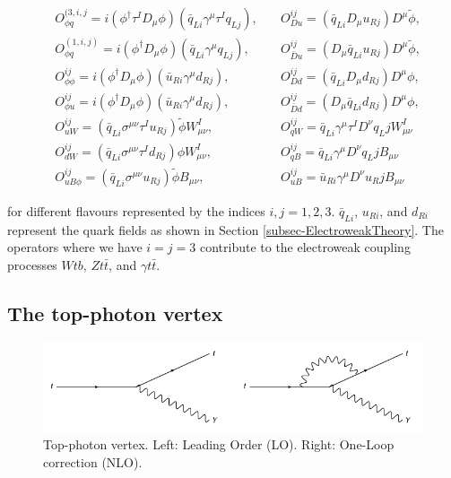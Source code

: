\begin{align}
& O^{(3, i, j}_{\phi q} = i(\phi^{\dagger}\tau^I D_{\mu} \phi)(\bar{q}_{Li}\gamma^{\mu}\tau^I q_{Lj}), \quad & O^{ij}_{Du} = (\bar{q}_{Li} D_{\mu} u_{Rj}) D^{\mu} \tilde{\phi}, \\
& O^{(1, i, j)}_{\phi q} = i(\phi^{\dagger} D_{\mu} \phi)(\bar{q}_{Li}\gamma^{\mu} q_{Lj}), \quad & O^{ij}_{\bar{D}u} = (D_{\mu} \bar{q}_{Li} u_{Rj}) D^{\mu} \tilde{\phi}, \\
& O^{ij}_{\phi \phi} = i(\phi^{\dagger} D_{\mu} \phi)(\bar{u}_{Ri}\gamma^{\mu} d_{Rj}), \quad & O^{ij}_{Dd} = (\bar{q}_{Li} D_{\mu} d_{Rj}) D^{\mu} \phi, \\
& O^{ij}_{\phi u} = i(\phi^{\dagger} D_{\mu} \phi)(\bar{u}_{Ri}\gamma^{\mu} d_{Rj}), \quad & O^{ij}_{\bar{D}d} = (D_{\mu} \bar{q}_{Li} d_{Rj}) D^{\mu} \phi, \\
& O^{ij}_{uW} = (\bar{q}_{Li} \sigma^{\mu \nu} \tau^I u_{Rj})\tilde{\phi} W^I_{\mu \nu}, \quad & O^{ij}_{qW} = \bar{q}_{Li} \gamma^{\mu} \tau^I D^{\nu} q_Lj W^I_{\mu \nu}\\
& O^{ij}_{dW} = (\bar{q}_{Li} \sigma^{\mu \nu} \tau^I d_{Rj})\phi W^I_{\mu \nu}, \quad & O^{ij}_{qB} = \bar{q}_{Li} \gamma^{\mu} D^{\nu} q_Lj B_{\mu \nu}\\
& O^{ij}_{uB\phi} = (\bar{q}_{Li} \sigma^{\mu \nu} u_{Rj})\tilde{\phi} B_{\mu \nu}, \quad & O^{ij}_{uB} = \bar{u}_{Ri} \gamma^{\mu} D^{\nu} u_Rj B_{\mu \nu}
\end{align} \label{eqn-effectiveOperators}

for different flavours represented by the indices $i,j = 1,2,3$. $\bar{q}_{Li}$, $u_{Ri}$, and $d_{Ri}$ represent the quark fields as shown in Section \ref{subsec-ElectroweakTheory}. The operators where we have $i = j = 3$ contribute to the electroweak coupling processes $Wtb$, $Zt\bar{t}$, and $\gamma t\bar{t}$. 



\subsection{The top-photon vertex}

\begin{figure} 
\begin{center}
\includegraphics[width=\textwidth]{Figures/TopPhotonVertex.png}
\end{center}
\caption{Top-photon vertex. Left: Leading Order (LO). Right: One-Loop correction (NLO).}
\label{fig-TopPhotonVertex}
\end{figure}

